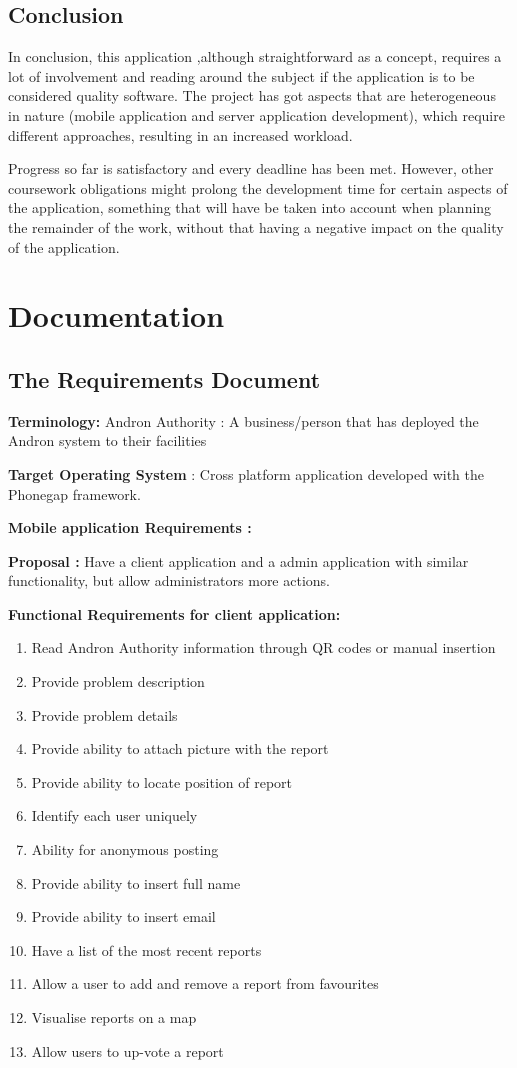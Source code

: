 \documentclass[12pt]{ecsproject}     %
\begin{document}
\pagebreak
\section{Conclusion}
In conclusion, this application ,although straightforward as a concept, requires a lot of involvement and reading around the subject if the application is to be considered quality software. The project has got aspects that are heterogeneous in nature (mobile application and server application development), which require different approaches, resulting in an increased workload.

Progress so far is satisfactory and every deadline has been met. However, other coursework obligations might prolong the development time for certain aspects of the application, something that will have be taken into account when planning the remainder of the work, without that having a negative impact on the quality of the application.

%
%
%
%
%
%
%
%
%
%

\appendix
\chapter{Documentation}
\section{The Requirements Document}
\textbf{Terminology:}
Andron Authority : A business/person that has deployed the Andron system to their facilities

\textbf{Target Operating System }: Cross platform application developed with the Phonegap framework.

\textbf{Mobile application Requirements :}

\textbf{Proposal :} Have a client application and a admin application with similar functionality, but allow administrators more actions. 

\textbf{Functional Requirements for client application:}
\begin{enumerate}
\item Read Andron Authority information through QR codes or manual insertion
\item Provide problem description
\item Provide problem details
\item Provide ability to attach picture with the report
\item Provide ability to locate position of report
\item Identify each user uniquely
\item  Ability for anonymous posting 
\item  Provide ability to insert full name
\item  Provide ability to insert email 
\item  Have a list of the most recent reports
\item  Allow a user to add and remove a report from favourites
\item  Visualise reports on a map
\item  Allow users to up-vote a report
\end{enumerate}
\end{document}
